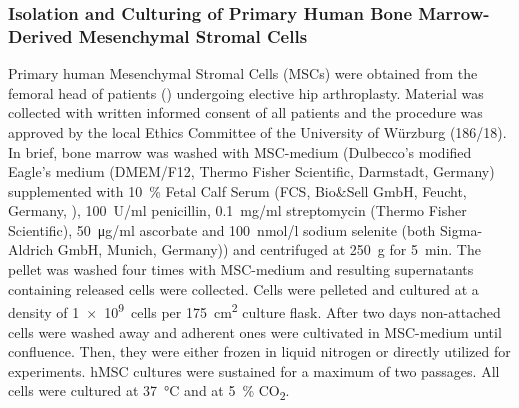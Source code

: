 


\subsubsection*{Isolation and Culturing of Primary Human Bone Marrow-Derived Mesenchymal Stromal Cells}
Primary human Mesenchymal Stromal Cells (MSCs) were obtained from the femoral
head of patients () undergoing elective hip
arthroplasty. Material was collected with written informed consent of all
patients and the procedure was approved by the local Ethics Committee of the
University of Würzburg (186/18). In brief, bone marrow was washed with
MSC-medium (Dulbecco’s modified Eagle’s medium (DMEM/F12, Thermo Fisher
Scientific, Darmstadt, Germany) supplemented with \SI{10}{\percent} Fetal Calf
Serum (FCS, Bio\&Sell GmbH, Feucht, Germany,
\citet{fernandez-rebolloHumanPlateletLysate2017}), \SI{100}{U/ml} penicillin,
\SI{0.1}{mg/ml} streptomycin (Thermo Fisher Scientific), \SI{50}{\micro\gram/ml}
ascorbate and \SI{100}{nmol/l} sodium selenite (both Sigma-Aldrich GmbH, Munich,
Germany)) and centrifuged at \SI{250}{g} for \SI{5}{\minute}. The pellet was
washed four times with MSC-medium and resulting supernatants containing released
cells were collected. Cells were pelleted and cultured at a density of
\SI{1e9}{cells} per \SI{175}{cm\squared} culture flask. After two days
non-attached cells were washed away and adherent ones were cultivated in
MSC-medium until confluence. Then, they were either frozen in liquid nitrogen or
directly utilized for experiments. hMSC cultures were sustained for a maximum of
two passages. All cells were cultured at \SI{37}{\degreeCelsius} and at
\SI{5}{\percent} CO\textsubscript{2}.


